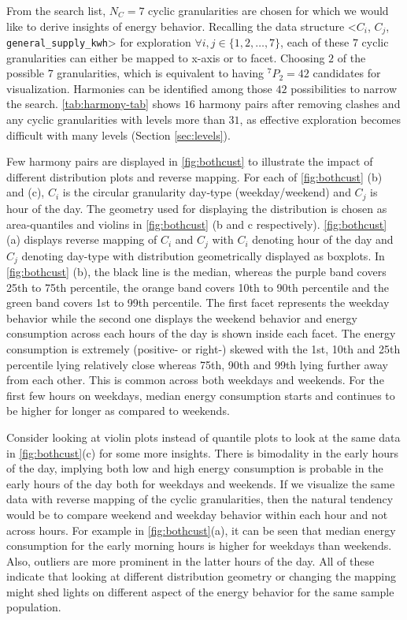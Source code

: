\documentclass[12pt]{article}
\begin{document}
From the search list, \(N_C = 7\) cyclic granularities are chosen for which we would like to derive insights of energy behavior. Recalling the data structure \textless{}\(C_i\), \(C_j\), \texttt{general\_supply\_kwh}\textgreater{} for exploration \(\forall i, j \in \{1, 2, \ldots, 7\}\), each of these \(7\) cyclic granularities can either be mapped to x-axis or to facet. Choosing \(2\) of the possible \(7\) granularities, which is equivalent to having \(^{7}P_2 = 42\) candidates for visualization. Harmonies can be identified among those \(42\) possibilities to narrow the search. \autoref{tab:harmony-tab} shows \(16\) harmony pairs after removing clashes and any cyclic granularities with levels more than \(31\), as effective exploration becomes difficult with many levels (Section \ref{sec:levels}).

\noindent Few harmony pairs are displayed in \autoref{fig:bothcust} to illustrate the impact of different distribution plots and reverse mapping. For each of \autoref{fig:bothcust} (b) and (c), \(C_i\) is the circular granularity day-type (weekday/weekend) and \(C_j\) is hour of the day. The geometry used for displaying the distribution is chosen as area-quantiles and violins in \autoref{fig:bothcust} (b and c respectively). \autoref{fig:bothcust} (a) displays reverse mapping of \(C_i\) and \(C_j\) with \(C_i\) denoting hour of the day and \(C_j\) denoting day-type with distribution geometrically displayed as boxplots.
In \autoref{fig:bothcust} (b), the black line is the median, whereas the purple band covers 25th to 75th percentile, the orange band covers 10th to 90th percentile and the green band covers 1st to 99th percentile. The first facet represents the weekday behavior while the second one displays the weekend behavior and energy consumption across each hours of the day is shown inside each facet. The energy consumption is extremely (positive- or right-) skewed with the 1st, 10th and 25th percentile lying relatively close whereas 75th, 90th and 99th lying further away from each other. This is common across both weekdays and weekends. For the first few hours on weekdays, median energy consumption starts and continues to be higher for longer as compared to weekends.

\noindent Consider looking at violin plots instead of quantile plots to look at the same data in \autoref{fig:bothcust}(c) for some more insights. There is bimodality in the early hours of the day, implying both low and high energy consumption is probable in the early hours of the day both for weekdays and weekends. If we visualize the same data with reverse mapping of the cyclic granularities, then the natural tendency would be to compare weekend and weekday behavior within each hour and not across hours. For example in \autoref{fig:bothcust}(a), it can be seen that median energy consumption for the early morning hours is higher for weekdays than weekends. Also, outliers are more prominent in the latter hours of the day. All of these indicate that looking at different distribution geometry or changing the mapping might shed lights on different aspect of the energy behavior for the same sample population.
\end{document}
